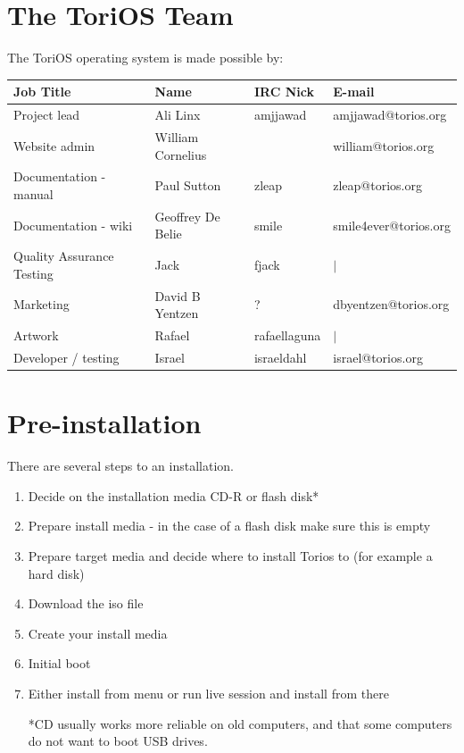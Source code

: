 \documentclass[12pt,a4paper]{book}
\begin{document}
\chapter{The ToriOS Team}
The ToriOS operating system is made possible by:
\begin{center}\begin{tabular}{|l|l|l|l|}
\hline \textbf{Job Title} & \textbf{Name} & \textbf{IRC Nick} & \textbf{E-mail} \\
\hline Project lead & Ali Linx & amjjawad & amjjawad@torios.org \\
\hline Website admin & William Cornelius &  & william@torios.org \\
\hline Documentation - manual & Paul Sutton & zleap	& zleap@torios.org \\
\hline Documentation - wiki & Geoffrey De Belie & smile & smile4ever@torios.org \\
\hline Quality Assurance Testing & Jack & fjack & $|$ \\
\hline Marketing & David B Yentzen & ? & dbyentzen@torios.org \\
\hline Artwork & Rafael & rafaellaguna & $|$ \\
\hline Developer / testing & Israel & israeldahl & israel@torios.org \\
\hline \end{tabular}\end{center}


\chapter{Pre-installation}
There are several steps to an installation. \\
\begin{enumerate}
\item Decide on the installation media CD-R or flash disk* 
\item Prepare install media - in the case of a flash disk make sure this is empty
\item Prepare target media and decide where to install Torios to (for example a hard disk)
\item Download the iso file
\item Create your install media
\item Initial boot
\item Either install from menu or run live session and install from there

*CD usually works more reliable on old computers, and that some computers do not want to boot USB drives. 

\end{enumerate}
\end{document}
